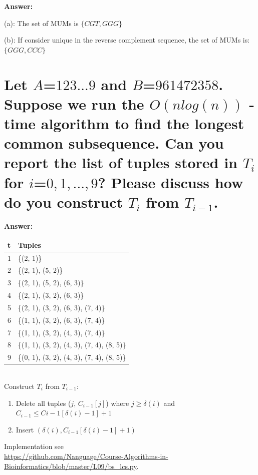 \documentclass{article}
\begin{document}
\large{\textbf{Answer:}}

(a): The set of MUMs is $\{CGT, GGG\}$

(b): If consider unique in the reverse complement sequence, the set of MUMs is:
$\{GGG, CCC\}$

\section{Let $A$=$1 2 3 ... 9$ and $B$=$9 6 1 4 7 2 3 5 8$. Suppose we run the $O(n log(n))$ -
time algorithm to find the longest common subsequence. Can you report the
list of tuples stored in $T_i$ for $i$=$0, 1, ..., 9$? Please discuss how do you construct
$T_i$ from $T_{i-1}$.
}

\large{\textbf{Answer:}} \\

\begin{tabular}{l|l}
    \hline
    t & Tuples \\
    \hline
    1 & \{(2, 1)\}\\
    2 & \{(2, 1), (5, 2)\}\\
    3 & \{(2, 1), (5, 2), (6, 3)\}\\
    4 & \{(2, 1), (3, 2), (6, 3)\}\\
    5 & \{(2, 1), (3, 2), (6, 3), (7, 4)\}\\
    6 & \{(1, 1), (3, 2), (6, 3), (7, 4)\}\\
    7 & \{(1, 1), (3, 2), (4, 3), (7, 4)\}\\
    8 & \{(1, 1), (3, 2), (4, 3), (7, 4), (8, 5)\} \\
    9 & \{(0, 1), (3, 2), (4, 3), (7, 4), (8, 5)\}
\end{tabular} \\

Construct $T_i$ from $T_{i-1}$:
\begin{enumerate}
    \item Delete all tuples ($j$, $C_{i-1}[j]$) where $j \geq \delta(i)$ and $C_{i-1} \leq C{i-1}[\delta(i) - 1] + 1$
    \item Insert $(\delta(i), C_{i-1}[\delta(i)-1]+1)$
\end{enumerate}

Implementation see \\
\url{https://github.com/Nanguage/Course-Algorithms-in-Bioinformatics/blob/master/L09/bs_lcs.py}.
\end{document}
